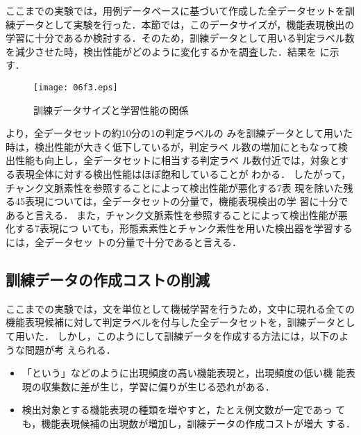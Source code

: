 \documentclass[japanese]{jnlp_1.2d}
\newcommand{\figref}[1]{}
\begin{document}
ここまでの実験では，用例データベースに基づいて作成した全データセットを訓
練データとして実験を行った．本節では，このデータサイズが，機能表現検出の
学習に十分であるか検討する．そのため，訓練データとして用いる判定ラベル数
を減少させた時，検出性能がどのように変化するかを調査した．結果を
\figref{fig:learning_curve}に示す．


\begin{figure}[b]
  \begin{center}
    \texttt{[image: 06f3.eps]}
  \end{center}
  \caption{訓練データサイズと学習性能の関係}
  \label{fig:learning_curve}
\end{figure}

\figref{fig:learning_curve}より，全データセットの約10分の1の判定ラベルの
みを訓練データとして用いた時は，検出性能が大きく低下しているが，判定ラベ
ル数の増加にともなって検出性能も向上し，全データセットに相当する判定ラベ
ル数付近では，対象とする表現全体に対する検出性能はほぼ飽和していることが
わかる．
したがって，チャンク文脈素性を参照することによって検出性能が悪化する7表
現を除いた残る45表現については，全データセットの分量で，機能表現検出の学
習に十分であると言える．
また，チャンク文脈素性を参照することによって検出性能が悪化する7表現につ
いても，形態素素性とチャンク素性を用いた検出器を学習するには，全データセッ
トの分量で十分であると言える．

\subsection{訓練データの作成コストの削減}

ここまでの実験では，文を単位として機械学習を行うため，文中に現れる全ての
機能表現候補に対して判定ラベルを付与した全データセットを，訓練データとし
て用いた．
しかし，このようにして訓練データを作成する方法には，以下のような問題が考
えられる．
\begin{itemize}
  \item 「という」などのように出現頻度の高い機能表現と，出現頻度の低い機
	能表現の収集数に差が生じ，学習に偏りが生じる恐れがある．
  \item 検出対象とする機能表現の種類を増やすと，たとえ例文数が一定であっ
	ても，機能表現候補の出現数が増加し，訓練データの作成コストが増大
	する．
\end{itemize}
\end{document}
